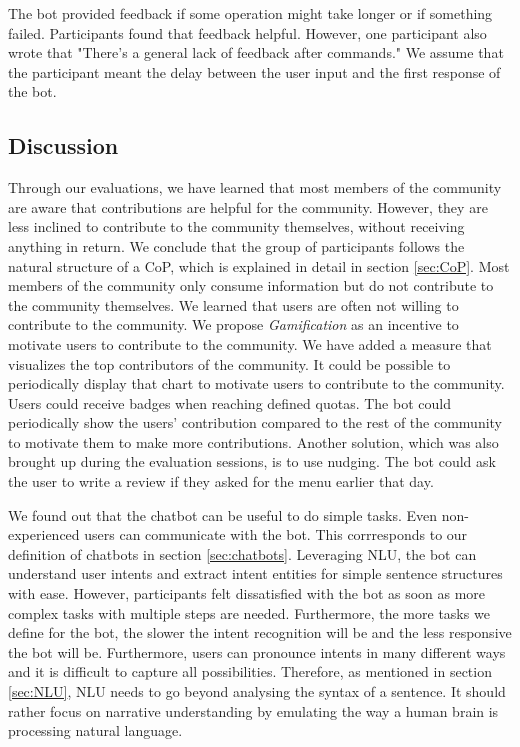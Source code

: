 The bot provided feedback if some operation might take longer or if something failed. Participants found that feedback helpful. However, one participant also wrote that "There's a general lack of feedback after commands." We assume that the participant meant the delay between the user input and the first response of the bot.  

\subsection{Discussion}
Through our evaluations, we have learned that most members of the community are aware that contributions are helpful for the community. However, they are less inclined to contribute to the community themselves, without receiving anything in return. 
We conclude that the group of participants follows the natural structure of a CoP, which is explained in detail in section \ref{sec:CoP}. Most members of the community only consume information but do not contribute to the community themselves. We learned that users are often not willing to contribute to the community. We propose \emph{Gamification} as an incentive to motivate users to contribute to the community.
We have added a measure that visualizes the top contributors of the community. It could be possible to periodically display that chart to motivate users to contribute to the community.
Users could receive badges when reaching defined quotas. The bot could periodically show the users' contribution compared to the rest of the community to motivate them to make more contributions.
Another solution, which was also brought up during the evaluation sessions, is to use nudging. The bot could ask the user to write a review if they asked for the menu earlier that day.

We found out that the chatbot can be useful to do simple tasks. Even non-experienced users can communicate with the bot. This corrresponds to our definition of chatbots in section \ref{sec:chatbots}. Leveraging NLU, the bot can understand user intents and extract intent entities for simple sentence structures with ease. However,  participants felt dissatisfied with the bot as soon as more complex tasks with multiple steps are needed. Furthermore, the more tasks we define for the bot, the slower the intent recognition will be and the less responsive the bot will be. 
Furthermore, users can pronounce intents in many different ways and it is difficult to capture all possibilities.
Therefore, as mentioned in section \ref{sec:NLU}, NLU needs to go beyond analysing the syntax of a sentence. It should rather focus on narrative understanding by emulating the way a human brain is processing natural language. \cite{CaWh14}